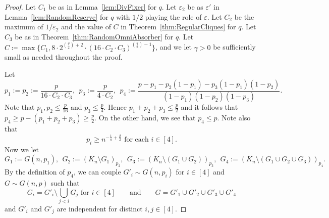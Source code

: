 \documentclass[11pt]{article}
\def\COMMENT#1{}
\numberwithin{equation}{section}
\newcommand{\eps}{\varepsilon}
\newcounter{i}
\theoremstyle{plain}
\theoremstyle{plain} %
\theoremstyle{definition}
\newcommand{\ProbCond}[2]{\ensuremath{%
    \mathbb P\left[#1\:\middle|\:#2\right]
  }}
\begin{document}
\begin{proof}
Let $C_1$ be as in Lemma~\ref{lem:DivFixer} for $q$. Let $\varepsilon_2$ be as $\varepsilon'$ in Lemma~\ref{lem:RandomReserve} for $q$ with $1/2$ playing the role of $\eps$. Let $C_2$ be the maximum of ${1}/{\varepsilon_2}$ and the value of $C$ in Theorem~\ref{thm:RegularCliques} for $q$. Let $C_3$ be as in Theorem~\ref{thm:RandomOmniAbsorber} for $q$.
Let $C \coloneqq \max\{C_1, 8\cdot 2^{\binom{q}{2} + 2}\cdot (16\cdot C_2 \cdot C_3)^{\binom{q}{2}-1}\}$, and we let $\gamma > 0$ be sufficiently small as needed throughout the proof. 

Let
$$p_1:= p_2:= \frac{p}{16\cdot C_2\cdot C_3},~~p_3:= \frac{p}{4\cdot C_2},~~p_4:=\frac{p-p_1-p_2(1-p_1)-p_3(1-p_1)(1-p_2)}{(1-p_1)(1-p_2)(1-p_3)}.$$
Note that $p_1,p_2\le \frac{p}{16}$ and $p_3 \le \frac{p}{4}$. Hence $p_1+p_2+p_3 \le \frac{p}{2}$ and it follows that $p_4 \ge p-(p_1+p_2+p_3) \ge \frac{p}{2}$. On the other hand, we see that $p_4 \le p$. 
Note also that
\begin{equation}\label{eqn:pi-lower-bound}
    p_i \geq n^{-\frac{1}{a} + \frac{\beta}{2}} \text{ for each } i \in [4].
\end{equation}
Now we let
$$G_1 := G(n,p_1),~~G_2:= (K_n\setminus G_1)_{p_2},~~G_3:= (K_n\setminus (G_1\cup G_2))_{p_3},~~G_4:= (K_n\setminus (G_1\cup G_2\cup G_3))_{p_4}.$$
By the definition of $p_4$\COMMENT{
    For each $e\in K_n$, choose $X_e \in [0, 1]$ independently and uniformly at random, and let $e \in G_i$ for $i \in [4]$ if $X_e \in [x_{i-1}, x_i)$ for $x_i$ as follows.  Let $x_0 = 0$ and $x_1 = p_1$, so $G_1 \sim G(n, p_1)$, as required.  We choose $x_2 \coloneqq p_2(1 - p_1) + p_1$ so that 
    \begin{equation*}
        p_2 = \ProbCond{e\in G_2}{e\notin G_1} = \frac{x_2 - x_1}{1 - x_1},
    \end{equation*}
    so $G_2 \sim (K_n \setminus G_1)_{p_2}$, as required.
    Note that $1 - x_2 = (1 - p_1)(1 - p_2)$.
    We choose $x_3 \coloneqq p_3(1 - p_1)(1 - p_2) + p_2(1 - p_1) + p_1$ so that 
    \begin{equation*}
        p_3 = \ProbCond{e\in G_3}{e\notin G_1\cup G_2} = \frac{x_3 - x_2}{1 - x_2},
    \end{equation*}
    so $G_3 \sim (K_n \setminus (G_1 \cup G_2))_{p_3}$, as required.
    Note that $1 - x_3 = (1 - p_1)(1 - p_2) - p_3(1 - p_1)(1 - p_2) = (1 - p_1)(1 - p_2)(1 - p_3)$.
    We choose $x_4 \coloneqq p$ so that 
    \begin{equation*}
        p_4 = \ProbCond{e\in G_4}{e\notin G_1\cup G_2 \cup G_3} = \frac{x_4 - x_3}{1 - x_3},
    \end{equation*}
    so $G_4 \sim (K_n \setminus (G_1 \cup G_2 \cup G_3))_{p_4}$, as required.  Since $x_4 = p$, ...
}, we can couple $G'_i \sim G(n,p_i)$ for $i \in [4]$ and $G \sim G(n,p)$ such that 
$$G_i = G'_i \setminus \bigcup_{j<i}G_j \text{ for $i \in [4]$}\qquad\text{and}\qquad G = G'_1\cup G'_2 \cup G'_3\cup G'_4$$ and $G'_i$ and $G'_j$ are independent for distinct $i,j \in [4]$.



\end{proof}
\end{document}
